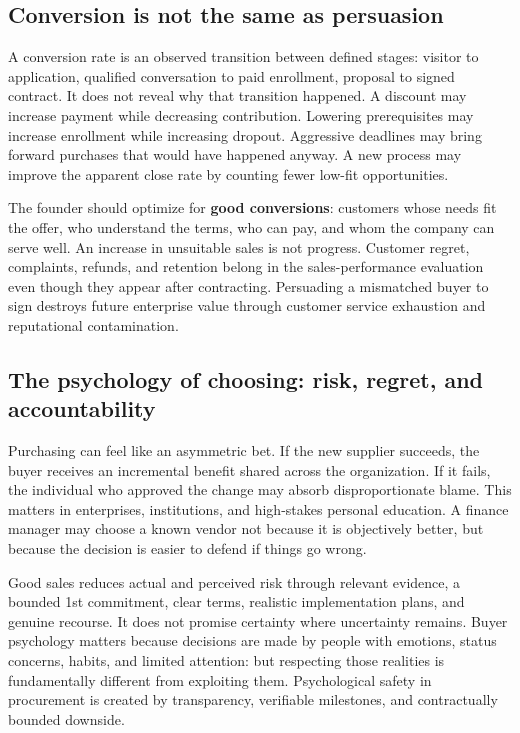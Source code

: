 \subsection{Conversion is not the same as persuasion}

A conversion rate is an observed transition between defined stages: visitor to application, qualified conversation to paid enrollment, proposal to signed contract. It does not reveal why that transition happened. A discount may increase payment while decreasing contribution. Lowering prerequisites may increase enrollment while increasing dropout. Aggressive deadlines may bring forward purchases that would have happened anyway. A new process may improve the apparent close rate by counting fewer low-fit opportunities.

The founder should optimize for \textbf{good conversions}: customers whose needs fit the offer, who understand the terms, who can pay, and whom the company can serve well. An increase in unsuitable sales is not progress. Customer regret, complaints, refunds, and retention belong in the sales-performance evaluation even though they appear after contracting. Persuading a mismatched buyer to sign destroys future enterprise value through customer service exhaustion and reputational contamination.

\subsection{The psychology of choosing: risk, regret, and accountability}

Purchasing can feel like an asymmetric bet. If the new supplier succeeds, the buyer receives an incremental benefit shared across the organization. If it fails, the individual who approved the change may absorb disproportionate blame. This matters in enterprises, institutions, and high-stakes personal education. A finance manager may choose a known vendor not because it is objectively better, but because the decision is easier to defend if things go wrong.

Good sales reduces actual and perceived risk through relevant evidence, a bounded 1st commitment, clear terms, realistic implementation plans, and genuine recourse. It does not promise certainty where uncertainty remains. Buyer psychology matters because decisions are made by people with emotions, status concerns, habits, and limited attention: but respecting those realities is fundamentally different from exploiting them. Psychological safety in procurement is created by transparency, verifiable milestones, and contractually bounded downside.

